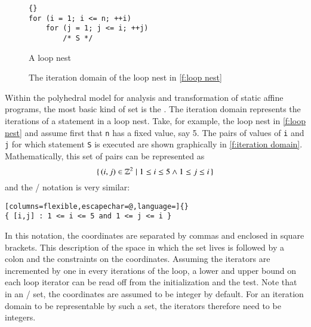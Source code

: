 \begin{figure}
\begin{lstlisting}[escapechar=@]{}
for (i = 1; i <= n; ++i)
    for (j = 1; j <= i; ++j)
        /* S */
\end{lstlisting}
\caption{A loop nest}
\label{f:loop nest}
\end{figure}

\begin{figure}
\caption{The iteration domain of the loop nest in \autoref{f:loop nest}}
\label{f:iteration domain}
\end{figure}

Within the polyhedral model for analysis and transformation of
static affine programs, the most basic kind of set is the
.
The iteration domain represents the iterations of a statement in a loop nest.
Take, for example, the loop nest in \autoref{f:loop nest}
and assume first that \lstinline{n} has a fixed value, say 5.
The pairs of values of \lstinline{i} and \lstinline{j} for
which statement \lstinline{S} is executed are shown graphically
in \autoref{f:iteration domain}.
Mathematically, this set of pairs can be represented as
$$
\{\,
(i,j) \in \mathbb{Z}^2 \mid 1 \le i \le 5 \wedge 1 \le j \le i
\,\}
$$
and the \isl/ notation is very similar:
\begin{lstlisting}[columns=flexible,escapechar=@,language=]{}
{ [i,j] : 1 <= i <= 5 and 1 <= j <= i }
\end{lstlisting}
In this notation,
the coordinates are separated by commas and enclosed in square
brackets.  This description of the space in which the set lives
is followed by a colon and the constraints on the coordinates.
Assuming the iterators are incremented by one in every iterations
of the loop, a lower and upper bound on each loop iterator
can be read off from the initialization and the test.
Note that in an \iscc/ set,
the coordinates are assumed to be integer by default.
For an iteration domain to be representable by such a set,
the iterators therefore need to be integers.

